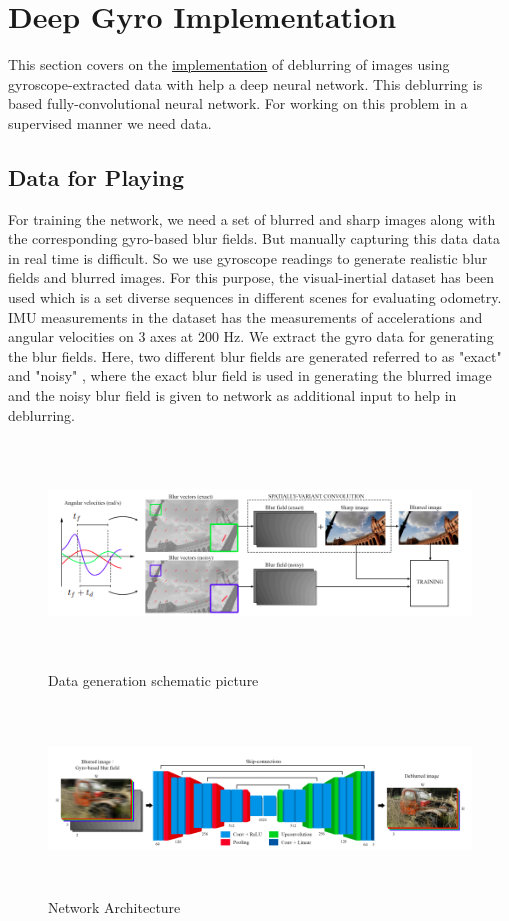\documentclass[10pt,twocolumn,letterpaper]{article}
\begin{document}
\section{Deep Gyro \cite{mustaniemi2018gyroscopeaided} Implementation}
This section covers on the \href{https://drive.google.com/drive/folders/1Lh97DlusYyZEkIuu9gvTZXaLcDK3dlXc?usp=sharing}{implementation} of deblurring of images using gyroscope-extracted data with help a deep neural network. This deblurring is based fully-convolutional neural network. For working on this problem in a supervised manner we need data.
\subsection{Data for Playing}
For training the network, we need a set of blurred and sharp images along with the corresponding gyro-based blur fields. But manually capturing this data data in real time is difficult. So we use gyroscope readings to generate realistic blur fields and blurred images. For this purpose, the visual-inertial dataset has been used which is a set diverse sequences in different scenes for evaluating odometry. IMU measurements in the dataset has the measurements of accelerations and angular velocities on 3 axes at 200 Hz. We extract the gyro data for generating the blur fields. Here, two different blur fields are generated referred to as "exact" and "noisy" , where the exact blur field is used in generating the blurred image and the noisy blur field is given to network as additional input to help in deblurring. 
\begin{figure}[h]
    \centering
    \includegraphics[width=2.2\columnwidth,height=6cm]{images/dat_gen.png}
    \caption{ Data generation schematic picture}
    \label{fig: data_generation}
\end{figure}
\begin{figure}[h]
    \centering
    \includegraphics[width=2.2\columnwidth,height=5cm]{images/architecture.png}
    \caption{ Network Architecture}
    \label{fig: result_deepgyro}
\end{figure}\\
\end{document}
